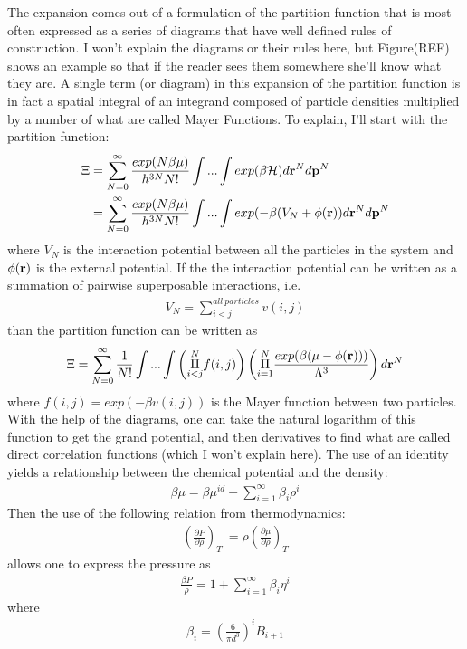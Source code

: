 The expansion comes out of a formulation of the partition function
that is most often expressed as a series of diagrams that have well
defined rules of construction.  I won't explain the diagrams or their
rules here, but Figure(REF) shows an example so that if the reader
sees them somewhere she'll know what they are.  A single term (or
diagram) in this expansion of the partition function is in fact a
spatial integral of an integrand composed of particle densities
multiplied by a number of what are called Mayer Functions.  To
explain, I'll start with the partition function:
\begin{align}
  \Xi &= \sum_{N=0}^{\infty}\frac{exp(N\beta\mu)}{h^{3N}N!}\int...\int exp(\beta \mathcal{H})d\textbf{r}^Nd\mathbf{p}^N \\
  &=\sum_{N=0}^{\infty}\frac{exp(N\beta\mu)}{h^{3N}N!}\int...\int exp(-\beta (V_N + \phi(\textbf{r}))d\textbf{r}^Nd\mathbf{p}^N
\end{align}
where $V_N$ is the interaction potential between all the particles in
the system and $\phi(\textbf{r})$ is the external potential.  If the the
interaction potential can be written as a summation of pairwise
superposable interactions, i.e.
\begin{align}
  V_N = \sum_{i<j}^{all~particles} v(i,j)
\end{align}
 than the partition function can be written as
\begin{align}
  \Xi = \sum_{N=0}^{\infty}\frac{1}{N!}\int... \int \left(\overset{N}{\underset{i<j}{\Pi}} f(i,j)\right)
  \left( \overset{N}{\underset{i=1}{\Pi}} \frac{exp(\beta (\mu - \phi(\textbf{r})))}{\Lambda^3}\right)d\textbf{r}^N
\end{align}
where $f(i,j)=exp(-\beta v(i,j))$ is the Mayer function between two
particles.  With the help of the diagrams, one can take the natural
logarithm of this function to get the grand potential, and then
derivatives to find what are called direct correlation functions
(which I won't explain here). The use of an identity yields a
relationship between the chemical potential and the density:
\begin{align}
  \beta \mu = \beta \mu^{id} - \sum_{i=1}^{\infty}\beta_i\rho^i
\end{align}
Then the use of the following relation from thermodynamics:
\begin{align}
  \left(\frac{\partial P}{\partial \rho}\right)_T \
  = \rho \left(\frac{\partial \mu}{\partial \rho}\right)_T
\end{align}
allows one to express the pressure as
\begin{align}
  \frac{\beta P}{\rho} = 1 + \sum_{i=1}^{\infty}\beta_i\eta^i
\end{align}
where
\begin{align}
  \label{eq:virial-coeff}
  \beta_i = (\frac{6}{\pi d^3})^i B_{i+1}
\end{align}


